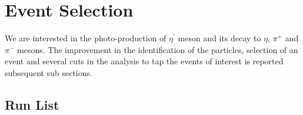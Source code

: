 \documentclass[12pt,a4paper]{amsbook}
\theoremstyle{definition}
\begin{document}
\section{Event Selection}

We are interested in the photo-production of $\eta^{\prime}$ meson and its decay to $\eta$, $\pi^{+}$ and $\pi^{-}$ mesons.  The improvement in the identification of the particles, selection of an event and several cuts in the analysis to tap the events of interest is reported subsequent sub sections.



\subsection{Run List}
\end{document}
